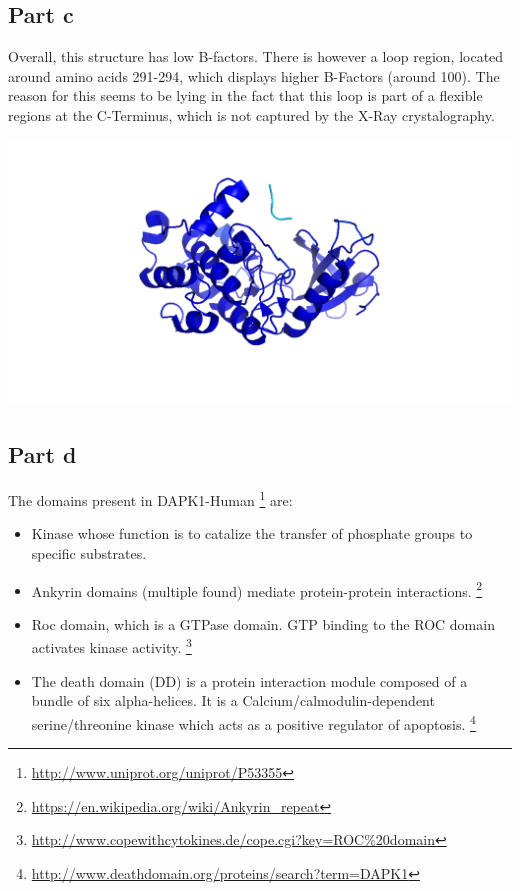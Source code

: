 \documentclass[11pt, a4paper,titlepage]{article}
\begin{document}
\subsection*{Part c}

Overall, this structure has low B-factors. There is however a loop
region, located around amino acids 291-294, which displays higher
B-Factors (around 100). The reason for this seems to be lying in the
fact that this loop is part of a flexible regions at the C-Terminus,
which is not captured by the X-Ray crystalography.

\includegraphics[width=15cm]{./Figures/5c.png}

\subsection*{Part d}

The domains present in DAPK1-Human
\footnote{\url{http://www.uniprot.org/uniprot/P53355}} are:

\begin{itemize}
\item Kinase whose function is to catalize the transfer of phosphate
  groups to specific substrates.
\item Ankyrin domains (multiple found) mediate protein-protein
  interactions.
  \footnote{\url{https://en.wikipedia.org/wiki/Ankyrin_repeat}}
\item Roc domain, which is a GTPase domain. GTP binding to the ROC
  domain activates kinase activity.
  \footnote{\url{http://www.copewithcytokines.de/cope.cgi?key=ROC\%20domain}} 
\item The death domain (DD) is a protein interaction module composed
  of a bundle of six alpha-helices. It is a
  Calcium/calmodulin-dependent serine/threonine kinase which acts as a
  positive regulator of apoptosis.
  \footnote{\url{http://www.deathdomain.org/proteins/search?term=DAPK1}}
\end{itemize}
\end{document}

